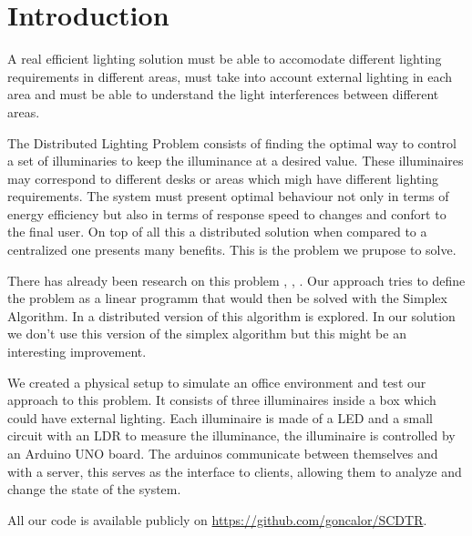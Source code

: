 \section{Introduction}

A real efficient lighting solution must be able to accomodate different lighting requirements in different areas, must take into account external lighting in each area and must be able to understand the light interferences between different areas.

The Distributed Lighting Problem consists of finding the optimal way to control a set of illuminaries to keep the illuminance at a desired value. These illuminaires may correspond to different desks or areas which migh have different lighting requirements. The system must present optimal behaviour not only in terms of energy efficiency but also in terms of response speed to changes and confort to the final user. On top of all this a distributed solution when compared to a centralized one presents many benefits. This is the problem we prupose to solve.

There has already been research on this problem \cite{caicedo2013distributed}, \cite{caicedo2011occupancy}, \cite{pandharipande2011daylight}. Our approach tries to define the problem as a linear programm that would then be solved with the Simplex Algorithm. In \cite{DistributedSimplex} a distributed version of this algorithm is explored. In our solution we don't use this version of the simplex algorithm but this might be an interesting improvement.

We created a physical setup to simulate an office environment and test our approach to this problem. It consists of three illuminaires inside a box which could have external lighting. Each illuminaire is made of a LED and a small circuit with an LDR to measure the illuminance, the illuminaire is controlled by an Arduino UNO board. The arduinos communicate between themselves and with a server, this serves as the interface to clients, allowing them to analyze and change the state of the system.

All our code is available publicly on \url{https://github.com/goncalor/SCDTR}.
